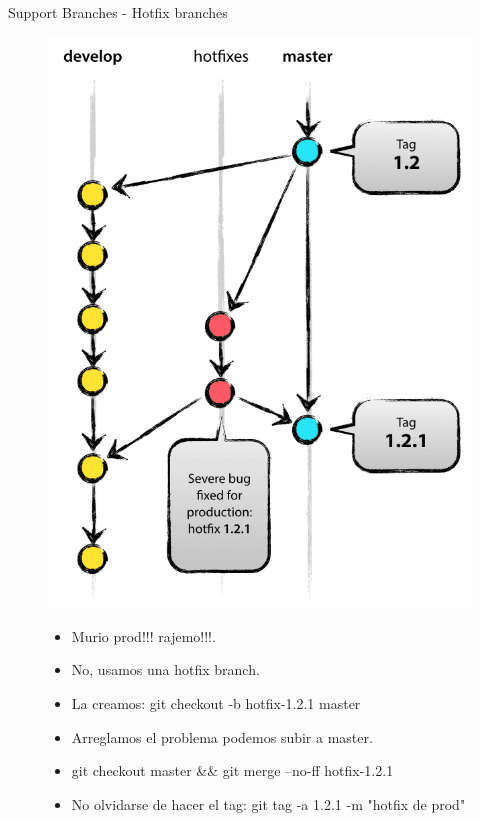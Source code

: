 \documentclass{beamer}
\begin{document}
\begin{frame}{Support Branches - Hotfix branches}
\begin{figure}
	\begin{minipage}{0.3\textwidth}
		\includegraphics[scale=0.15,left]{hotfix-branches.png}
	\end{minipage}
\begin{minipage}{0.6\textwidth}\raggedright
\begin{itemize}
  \item Murio prod!!! rajemo!!!.
  \item No, usamos una hotfix branch.
  \item La creamos: git checkout -b hotfix-1.2.1 master
  \item Arreglamos el problema podemos subir a master.
  \item git checkout master \&\& git merge --no-ff hotfix-1.2.1
  \item No olvidarse de hacer el tag: git tag -a 1.2.1 -m "hotfix de prod"
\end{itemize}
\end{minipage}
\end{figure}
\end{frame}
\end{document}
